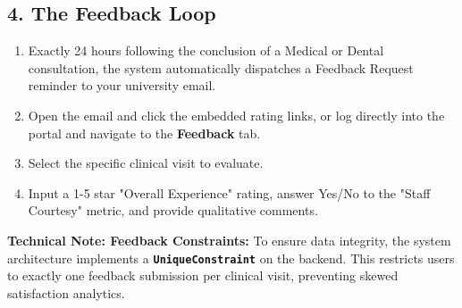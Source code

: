 \subsection{4. The Feedback Loop}
\begin{enumerate}
    \item Exactly 24 hours following the conclusion of a Medical or Dental consultation, the system automatically dispatches a Feedback Request reminder to your university email.
    \item Open the email and click the embedded rating links, or log directly into the portal and navigate to the \textbf{Feedback} tab.
    \item Select the specific clinical visit to evaluate.
    \item Input a 1-5 star "Overall Experience" rating, answer Yes/No to the "Staff Courtesy" metric, and provide qualitative comments.
\end{enumerate}
\textbf{Technical Note: Feedback Constraints:} To ensure data integrity, the system architecture implements a \textbf{\texttt{UniqueConstraint}} on the backend. This restricts users to exactly one feedback submission per clinical visit, preventing skewed satisfaction analytics.
